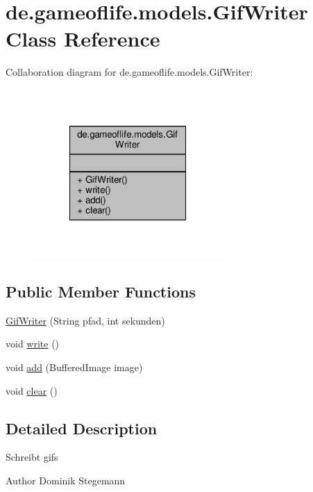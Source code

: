 \hypertarget{classde_1_1gameoflife_1_1models_1_1GifWriter}{\section{de.\-gameoflife.\-models.\-Gif\-Writer Class Reference}
\label{classde_1_1gameoflife_1_1models_1_1GifWriter}
}


Collaboration diagram for de.\-gameoflife.\-models.\-Gif\-Writer\-:\nopagebreak
\begin{figure}[H]
\begin{center}
\leavevmode
\includegraphics[width=204pt]{classde_1_1gameoflife_1_1models_1_1GifWriter__coll__graph}
\end{center}
\end{figure}
\subsection*{Public Member Functions}
\begin{DoxyCompactItemize}
\item 
\hyperlink{classde_1_1gameoflife_1_1models_1_1GifWriter_acaa5318f4d2c563cc4e77fb0ec8e6144}{Gif\-Writer} (String pfad, int sekunden)
\item 
void \hyperlink{classde_1_1gameoflife_1_1models_1_1GifWriter_af2bfba308b5fd28aaac823b2c0c446d6}{write} ()
\item 
void \hyperlink{classde_1_1gameoflife_1_1models_1_1GifWriter_a6f69ef9c202223d95e573de03b139efc}{add} (Buffered\-Image image)
\item 
void \hyperlink{classde_1_1gameoflife_1_1models_1_1GifWriter_abb6cf7b78d38d72b44b0699dace458ad}{clear} ()
\end{DoxyCompactItemize}


\subsection{Detailed Description}
Schreibt gifs \begin{DoxyAuthor}{Author}
Dominik Stegemann 
\end{DoxyAuthor}


